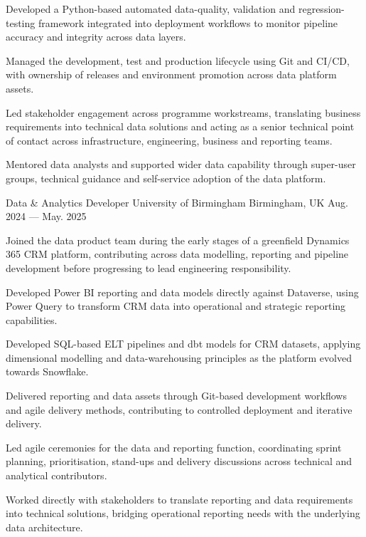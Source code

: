 \begin{cventries}
{\begin{cvitems}
    \item {Developed a Python-based automated data-quality, validation and regression-testing framework integrated into deployment workflows to monitor pipeline accuracy and integrity across data layers.}
    \item {Managed the development, test and production lifecycle using Git and CI/CD, with ownership of releases and environment promotion across data platform assets.}
    \item {Led stakeholder engagement across programme workstreams, translating business requirements into technical data solutions and acting as a senior technical point of contact across infrastructure, engineering, business and reporting teams.}
    \item {Mentored data analysts and supported wider data capability through super-user groups, technical guidance and self-service adoption of the data platform.}
    \end{cvitems}
  }

  \cventry
  {Data \& Analytics Developer} %
  {University of Birmingham } %
  {Birmingham, UK} %
  {Aug. 2024 --- May. 2025} %
  {
    \begin{cvitems}
    \item {Joined the data product team during the early stages of a greenfield Dynamics 365 CRM platform, contributing across data modelling, reporting and pipeline development before progressing to lead engineering responsibility.}
    \item {Developed Power BI reporting and data models directly against Dataverse, using Power Query to transform CRM data into operational and strategic reporting capabilities.}
    \item {Developed SQL-based ELT pipelines and dbt models for CRM datasets, applying dimensional modelling and data-warehousing principles as the platform evolved towards Snowflake.}
    \item {Delivered reporting and data assets through Git-based development workflows and agile delivery methods, contributing to controlled deployment and iterative delivery.}
    \item {Led agile ceremonies for the data and reporting function, coordinating sprint planning, prioritisation, stand-ups and delivery discussions across technical and analytical contributors.}
    \item {Worked directly with stakeholders to translate reporting and data requirements into technical solutions, bridging operational reporting needs with the underlying data architecture.}
    \end{cvitems}
  }


\end{cventries}
